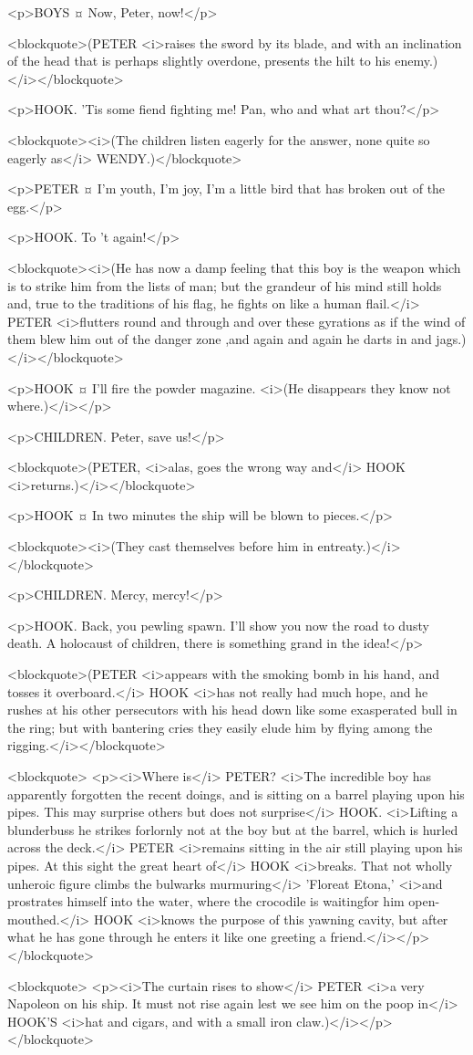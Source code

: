 <p>BOYS ¤
Now, Peter, now!</p>

<blockquote>(PETER <i>raises the sword by its blade, and with an inclination of the head that is perhaps slightly overdone, presents the hilt to his enemy.)</i></blockquote>

<p>HOOK. 'Tis some fiend fighting me! Pan, who and what art thou?</p>

<blockquote><i>(The children listen eagerly for the answer, none quite so eagerly as</i> WENDY.)</blockquote>

<p>PETER ¤
I'm youth, I'm joy, I'm a little bird that has broken out of the egg.</p>

<p>HOOK. To 't again!</p>

<blockquote><i>(He has now a damp feeling that this boy is the weapon which is to strike him from the lists of man; but the grandeur of his mind still holds and, true to the traditions of his flag, he fights on like a human flail.</i> PETER <i>flutters round and through and over these gyrations as if the wind of them blew him out of the danger zone ,and again and again he darts in and jags.)</i></blockquote>

<p>HOOK ¤
I'll fire the powder magazine. <i>(He disappears they know not where.)</i></p>

<p>CHILDREN. Peter, save us!</p>

<blockquote>(PETER, <i>alas, goes the wrong way and</i> HOOK <i>returns.)</i></blockquote>

<p>HOOK ¤
In two minutes the ship will be blown to pieces.</p>

<blockquote><i>(They cast themselves before him in entreaty.)</i></blockquote>

<p>CHILDREN. Mercy, mercy!</p>

<p>HOOK. Back, you pewling spawn. I'll show you now the road to dusty death. A holocaust of children, there is something grand in the idea!</p>

<blockquote>(PETER <i>appears with the smoking bomb in his hand, and tosses it overboard.</i> HOOK <i>has not really had much hope, and he rushes at his other persecutors with his head down like some exasperated bull in the ring; but with bantering cries they easily elude him by flying among the rigging.</i></blockquote>

<blockquote> <p><i>Where is</i> PETER? <i>The incredible boy has apparently forgotten the recent doings, and is sitting on a barrel playing upon his pipes. This may surprise others but does not surprise</i> HOOK. <i>Lifting a blunderbuss he strikes forlornly not at the boy but at the barrel, which is hurled across the deck.</i> PETER <i>remains sitting in the air still playing upon his pipes. At this sight the great heart of</i> HOOK <i>breaks. That not wholly unheroic figure climbs the bulwarks murmuring</i> 'Floreat Etona,' <i>and prostrates himself into the water, where the crocodile is waitingfor him open-mouthed.</i> HOOK <i>knows the purpose of this yawning cavity, but after what he has gone through he enters it like one greeting a friend.</i></p> </blockquote>

<blockquote> <p><i>The curtain rises to show</i> PETER <i>a very Napoleon on his ship. It must not rise again lest we see him on the poop in</i> HOOK'S <i>hat and cigars, and with a small iron claw.)</i></p> </blockquote>
